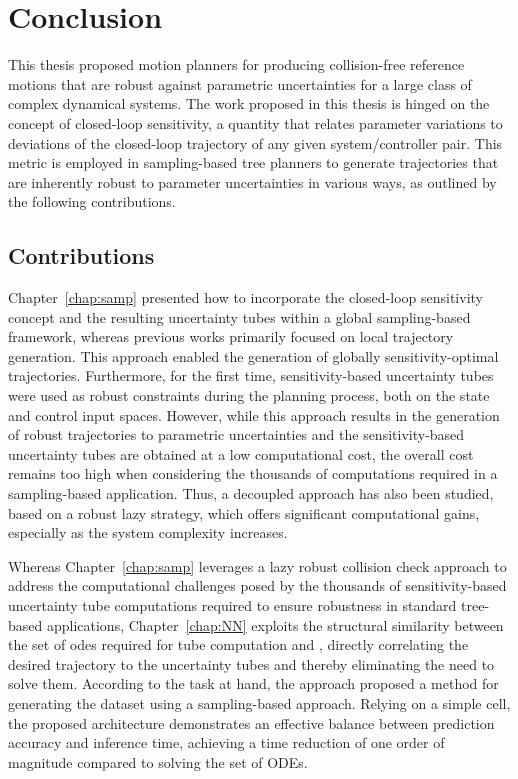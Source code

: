 \chapter{Conclusion}\label{chap:concl}

\glsresetall

This thesis proposed motion planners for producing collision-free reference motions that are robust against parametric uncertainties for a large class of complex dynamical systems. 
The work proposed in this thesis is hinged on the concept of closed-loop sensitivity, a quantity that relates parameter variations to deviations of the closed-loop trajectory of any given system/controller pair.
This metric is employed in sampling-based tree planners to generate trajectories that are inherently robust to parameter uncertainties in various ways, as outlined by the following contributions.

\section{Contributions}

Chapter~\ref{chap:samp} presented how to incorporate the closed-loop sensitivity concept and the resulting uncertainty tubes within a global sampling-based framework, whereas previous works primarily focused on local trajectory generation.
This approach enabled the generation of globally sensitivity-optimal trajectories. 
Furthermore, for the first time, sensitivity-based uncertainty tubes were used as robust constraints during the planning process, both on the state and control input spaces.
However, while this approach results in the generation of robust trajectories to parametric uncertainties and the sensitivity-based uncertainty tubes are obtained at a low computational cost, the overall cost remains too high when considering the thousands of computations required in a sampling-based application.
Thus, a decoupled approach has also been studied, based on a robust lazy strategy, which offers significant computational gains, especially as the system complexity increases.

Whereas Chapter~\ref{chap:samp} leverages a lazy robust collision check approach to address the computational challenges posed by the thousands of sensitivity-based uncertainty tube computations required to ensure robustness in standard tree-based applications, Chapter~\ref{chap:NN} exploits the structural similarity between the set of \gls{odes} required for tube computation and , directly correlating the desired trajectory to the uncertainty tubes and thereby eliminating the need to solve them.
According to the task at hand, the approach proposed a method for generating the dataset using a sampling-based approach.
Relying on a simple  cell, the proposed architecture demonstrates an effective balance between prediction accuracy and inference time, achieving a time reduction of one order of magnitude compared to solving the set of ODEs.

